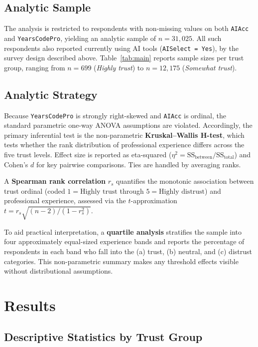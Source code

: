 \documentclass[11pt,a4paper]{article}
\begin{document}
\subsection{Analytic Sample}

The analysis is restricted to respondents with non-missing values on both \texttt{AIAcc}
and \texttt{YearsCodePro}, yielding an analytic sample of $n = 31{,}025$. All such
respondents also reported currently using AI tools (\texttt{AISelect = Yes}), by the
survey design described above. Table~\ref{tab:main} reports sample sizes per trust group,
ranging from $n = 699$ (\emph{Highly trust}) to $n = 12{,}175$ (\emph{Somewhat trust}).

\subsection{Analytic Strategy}

Because \texttt{YearsCodePro} is strongly right-skewed and \texttt{AIAcc} is ordinal,
the standard parametric one-way ANOVA assumptions are violated. Accordingly, the primary
inferential test is the non-parametric \textbf{Kruskal--Wallis H-test}, which tests
whether the rank distribution of professional experience differs across the five trust
levels. Effect size is reported as eta-squared ($\eta^2 = \text{SS}_\text{between} /
\text{SS}_\text{total}$) and Cohen's $d$ for key pairwise comparisons. Ties are handled
by averaging ranks.

A \textbf{Spearman rank correlation} $r_s$ quantifies the monotonic association between
trust ordinal (coded $1 = \text{Highly trust}$ through $5 = \text{Highly distrust}$)
and professional experience, assessed via the $t$-approximation
$t = r_s \sqrt{(n-2)/(1-r_s^2)}$.

To aid practical interpretation, a \textbf{quartile analysis} stratifies the sample into
four approximately equal-sized experience bands and reports the percentage of respondents
in each band who fall into the (a) trust, (b) neutral, and (c) distrust categories.
This non-parametric summary makes any threshold effects visible without distributional
assumptions.

\section{Results}
\label{sec:results}

\subsection{Descriptive Statistics by Trust Group}
\end{document}
